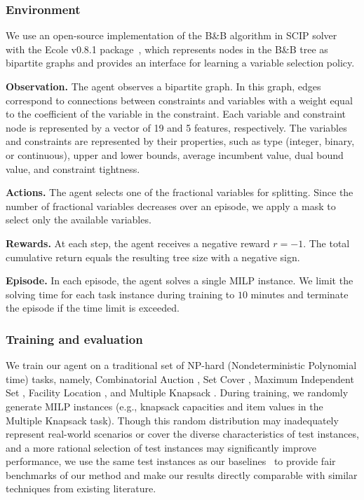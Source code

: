 \documentclass[preprint,12pt]{elsarticle} %
\theoremstyle{plain}
\theoremstyle{definition}
\theoremstyle{remark}
\begin{document}
\subsubsection{Environment}
We use an open-source implementation of the B\&B algorithm in SCIP solver with the Ecole v0.8.1 package~\cite{ecole}, which represents nodes in the B\&B tree as bipartite graphs and provides an interface for learning a variable selection policy. 

\textbf{Observation.} The agent observes a bipartite graph. In this graph, edges correspond to connections between constraints and variables with a weight equal to the coefficient of the variable in the constraint. Each variable and constraint node is represented by a vector of 19 and 5 features, respectively. The variables and constraints are represented by their properties, such as type (integer, binary, or continuous), upper and lower bounds, average incumbent value, dual bound value, and constraint tightness. 

\textbf{Actions.} The agent selects one of the fractional variables for splitting. Since the number of fractional variables decreases over an episode, we apply a mask to select only the available variables. 

\textbf{Rewards.} At each step, the agent receives a negative reward $r = -1$. The total cumulative return equals the resulting tree size with a negative sign. 

\textbf{Episode.} In each episode, the agent solves a single MILP instance. We limit the solving time for each task instance during training to $10$ minutes and terminate the episode if the time limit is exceeded. 


\subsubsection{Training and evaluation}
We train our agent on a traditional set of NP-hard (Nondeterministic Polynomial time) tasks, namely, Combinatorial Auction \cite{cauct}, Set Cover \cite{setcover}, Maximum Independent Set \cite{indset}, Facility Location \cite{facilityloc}, and Multiple Knapsack \cite{knapsack}. During training, we randomly generate MILP instances (e.g., knapsack capacities and item values in the Multiple Knapsack task). Though this random distribution may inadequately represent real-world scenarios or cover the diverse characteristics of test instances, and a more rational selection of test instances may significantly improve performance, we use the same test instances as our baselines~\cite{etheve_2020,scavuzzo_2022,gasse_2019} to provide fair benchmarks of our method and make our results directly comparable with similar techniques from existing literature.
\end{document}
